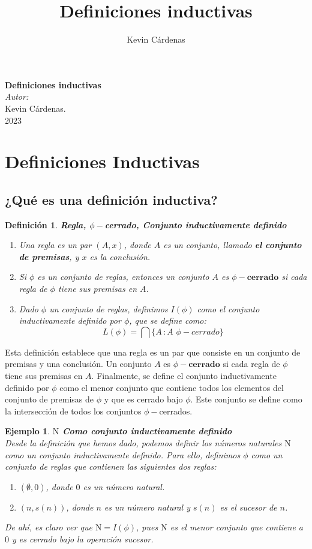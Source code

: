 \documentclass[executivepaper]{article}
\title{Definiciones inductivas}
\author{Kevin Cárdenas}
\newtheorem{defi}[propo]{Definición}
\newtheorem{ejemplo}[propo]{Ejemplo}
\begin{document}
\begin{titlepage}
    \begin{center}
        {\Huge \textbf{Definiciones inductivas}}
        \\[18cm]

        \large\emph{Autor:}\\
        Kevin Cárdenas.
        \\[1cm]
        {\large 2023}
    \end{center}
\end{titlepage}

\newpage
\tableofcontents
\newpage
\section{Definiciones Inductivas}
\subsection{¿Qué es una definición inductiva?}
\begin{defi}
\textbf{Regla, $\phi-$cerrado, Conjunto inductivamente definido}
\begin{enumerate}
\item Una regla es un par $(A,x)$, donde $A$ es un conjunto, llamado \textbf{el conjunto de premisas}, y $x$ es la conclusión.
\item Si $\phi$ es un conjunto de reglas, entonces un conjunto $A$ es $\phi - \textbf{cerrado}$ si cada regla de $\phi$ tiene sus premisas en $A$.
\item Dado $\phi$ un conjunto de reglas, definimos $I(\phi)$ como el conjunto inductivamente definido por $\phi$, que se define como:
$$L(\phi) = \bigcap\{A \, : A\,\, \phi-cerrado\}$$
\end{enumerate}
\end{defi}
Esta definición establece que una regla es un par que consiste en un conjunto de premisas y una conclusión. Un conjunto $A$ es $\phi - \textbf{cerrado}$ si cada regla de $\phi$ tiene sus premisas en $A$. Finalmente, se define el conjunto inductivamente definido por $\phi$ como el menor conjunto que contiene todos los elementos del conjunto de premisas de $\phi$ y que es cerrado bajo $\phi$. Este conjunto se define como la intersección de todos los conjuntos $\phi-$cerrados.

\begin{ejemplo}\textbf{$\mathrm{N}$ Como conjunto inductivamente definido}\\
Desde la definición que hemos dado, podemos definir los números naturales $\mathrm{N}$ como un conjunto inductivamente definido. Para ello, definimos $\phi$ como un conjunto de reglas que contienen las siguientes dos reglas:
\begin{enumerate}
\item $(\emptyset,0)$, donde $0$ es un número natural.
\item $({n},s(n))$, donde $n$ es un número natural y $s(n)$ es el sucesor de $n$.
\end{enumerate}
De ahí, es claro ver que $\mathrm{N} = I(\phi)$, pues $\mathrm{N}$ es el menor conjunto que contiene a $0$ y es cerrado bajo la operación sucesor.
\end{ejemplo}
\end{document}
